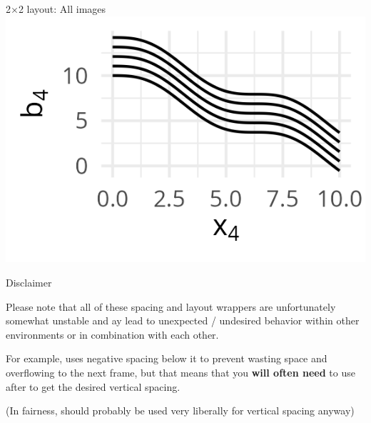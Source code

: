 \documentclass[11pt,compress,t,notes=noshow, xcolor=table]{beamer}
\begin{document}
\begin{frame}{2$\times$2 layout: All images}
{  }{%
    \includegraphics[width=\textwidth]{figure/boosting-cwb-blpool4.png}
  }
\end{frame}

\begin{frame}{Disclaimer}


  \vfill

  Please note that all of these spacing and layout wrappers are unfortunately somewhat unstable and ay lead to unexpected / undesired behavior within other environments or in combination with each other.

  \vfill

  For example,  uses negative spacing below it to prevent wasting space and overflowing to the next frame, but that means that you \textbf{will often need} to use  after  to get the desired vertical spacing.

  \vfill

  (In fairness,  should probably be used very liberally for vertical spacing anyway)

\end{frame}

\end{document}
